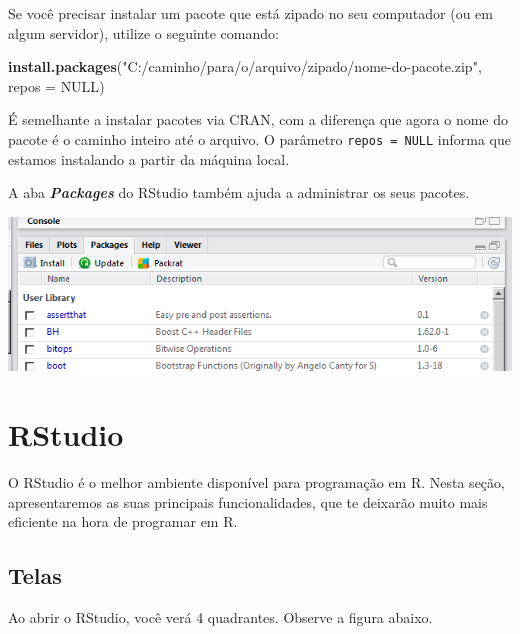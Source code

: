 \documentclass[
]{book}
\newenvironment{Shaded}{\begin{snugshade}}{\end{snugshade}}
\newcommand{\DataTypeTok}[1]{\textcolor[rgb]{0.13,0.29,0.53}{#1}}
\newcommand{\KeywordTok}[1]{\textcolor[rgb]{0.13,0.29,0.53}{\textbf{#1}}}
\newcommand{\NormalTok}[1]{#1}
\newcommand{\OtherTok}[1]{\textcolor[rgb]{0.56,0.35,0.01}{#1}}
\newcommand{\StringTok}[1]{\textcolor[rgb]{0.31,0.60,0.02}{#1}}
\begin{document}
Se você precisar instalar um pacote que está zipado no seu computador (ou em algum servidor), utilize o seguinte comando:

\begin{Shaded}
\begin{Highlighting}[]
\KeywordTok{install.packages}\NormalTok{(}\StringTok{"C:/caminho/para/o/arquivo/zipado/nome{-}do{-}pacote.zip"}\NormalTok{, }\DataTypeTok{repos =} \OtherTok{NULL}\NormalTok{)}
\end{Highlighting}
\end{Shaded}

É semelhante a instalar pacotes via CRAN, com a diferença que agora o nome do pacote é o caminho inteiro até o arquivo. O parâmetro \texttt{repos\ =\ NULL} informa que estamos instalando a partir da máquina local.

A aba \textbf{\emph{Packages}} do RStudio também ajuda a administrar os seus pacotes.

\begin{center}\includegraphics[width=9.06in]{img/instalacao/instalar_pacote_rstudio} \end{center}

\hypertarget{rstudio}{%
\chapter{RStudio}\label{rstudio}}

O RStudio é o melhor ambiente disponível para programação em R. Nesta seção, apresentaremos as suas principais funcionalidades, que te deixarão muito mais eficiente na hora de programar em R.

\hypertarget{telas}{%
\section{Telas}\label{telas}}

Ao abrir o RStudio, você verá 4 quadrantes. Observe a figura abaixo.
\end{document}

